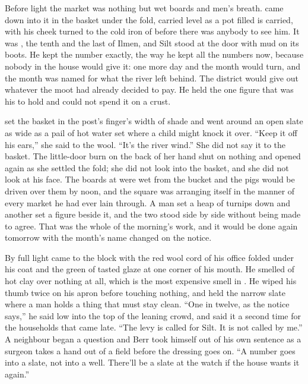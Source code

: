 
Before light the market was nothing but wet boards and men's breath.  came down into it in the basket under the fold, carried level as a pot filled is carried, with his cheek turned to the cold iron of  before there was anybody to see him. It was , the tenth and the last of Ilmen, and Silt stood at the door with mud on its boots. He kept the number exactly, the way he kept all the numbers now, because nobody in the house would give it: one more day and the month would turn, and the month was named for what the river left behind. The district would give out whatever the moot had already decided to pay. He held the one figure that was his to hold and could not spend it on a crust.

 set the basket in the post's finger's width of shade and went around an open slate as wide as a pail of hot water set where a child might knock it over. “Keep it off his ears,” she said to the wool. “It's the river wind.” She did not say it to the basket. The little-door burn on the back of her hand shut on nothing and opened again as she settled the fold; she did not look into the basket, and she did not look at his face. The boards at  were wet from the bucket and the pigs would be driven over them by noon, and the square was arranging itself in the manner of every market he had ever lain through. A man set a heap of turnips down and another set a figure beside it, and the two stood side by side without being made to agree. That was the whole of the morning's work, and it would be done again tomorrow with the month's name changed on the notice.

By full light  came to the block with the red wool cord of his office folded under his coat and the green of tasted glaze at one corner of his mouth. He smelled of hot clay over nothing at all, which is the most expensive smell in . He wiped his thumb twice on his apron before touching nothing, and held the narrow slate where a man holds a thing that must stay clean. “One in twelve, as the notice says,” he said low into the top of the leaning crowd, and said it a second time for the households that came late. “The levy is called for Silt. It is not called by me.” A neighbour began a question and Berr took himself out of his own sentence as a surgeon takes a hand out of a field before the dressing goes on. “A number goes into a slate, not into a well. There'll be a slate at the watch if the house wants it again.”


